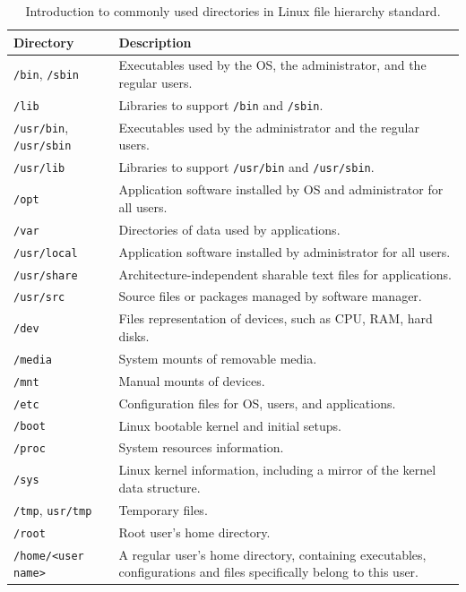 \begin{table}
  \centering \caption{Introduction to commonly used directories in Linux file hierarchy standard.}\label{ch4tab:hierarchyintro}
  \begin{tabularx}{\textwidth}{lX}
    \hline
    Directory & Description \\ \hline
    \verb|/bin|, \verb|/sbin| & Executables used by the OS, the administrator, and the regular users. \\ \hdashline
    \verb|/lib| & Libraries to support \verb|/bin| and \verb|/sbin|. \\ \hdashline
    \verb|/usr/bin|, \verb|/usr/sbin| & Executables used by the administrator and the regular users. \\ \hdashline
    \verb|/usr/lib| & Libraries to support \verb|/usr/bin| and \verb|/usr/sbin|. \\ \hdashline
    \verb|/opt| & Application software installed by OS and administrator for all users. \\ \hdashline
    \verb|/var| & Directories of data used by applications. \\ \hdashline
    \verb|/usr/local| & Application software installed by administrator for all users. \\ \hdashline
    \verb|/usr/share| & Architecture-independent sharable text files for applications. \\ \hdashline
    \verb|/usr/src| & Source files or packages managed by software manager. \\ \hdashline
    \verb|/dev| & Files representation of devices, such as CPU, RAM, hard disks. \\ \hdashline
    \verb|/media| & System mounts of removable media. \\ \hdashline
    \verb|/mnt| & Manual mounts of devices. \\ \hdashline
    \verb|/etc| & Configuration files for OS, users, and applications. \\ \hdashline
    \verb|/boot| & Linux bootable kernel and initial setups. \\ \hdashline
    \verb|/proc| & System resources information. \\ \hdashline
    \verb|/sys| & Linux kernel information, including a mirror of the kernel data structure. \\ \hdashline
    \verb|/tmp|, \verb|usr/tmp| & Temporary files. \\ \hdashline
    \verb|/root| & Root user's home directory. \\ \hdashline
    \verb|/home/<user name>| & A regular user's home directory, containing executables, configurations and files specifically belong to this user. \\
    \hline
  \end{tabularx}
\end{table}

